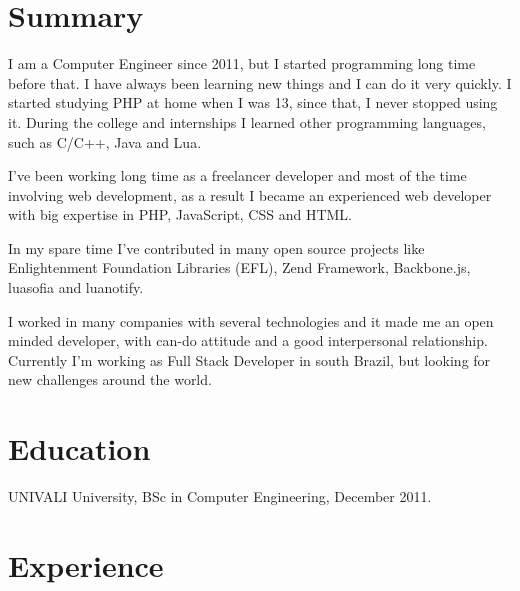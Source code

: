 \documentclass[margin]{res}
\begin{document}
  

\address{Florianopolis, BR \\ guilherme@giox.com.br \\ Phone: +55 48 XXXXXXXX }
                           
                        
\begin{resume}                        
 
\section{Summary}   
I am a Computer Engineer since 2011, but I started programming long time before that. I have always been learning new things and I can do it very quickly. I started studying PHP at home when I was 13, since that, I never stopped using it. During the college and internships I learned other programming languages, such as C/C++, Java and Lua.

I’ve been working long time as a freelancer developer and most of the time involving web development, as a result I became an experienced web developer with big expertise in PHP, JavaScript, CSS and HTML.

In my spare time I’ve contributed in many open source projects like Enlightenment Foundation Libraries (EFL), Zend Framework, Backbone.js, luasofia and luanotify.

I worked in many companies with several technologies and it made me an open minded developer, with can-do attitude and a good interpersonal relationship. Currently I’m working as Full Stack Developer in south Brazil, but looking for new challenges around the world.
 
\section{Education} UNIVALI University, BSc in Computer Engineering, December 2011.
  
\section{Experience}


\end{resume}
\end{document}

